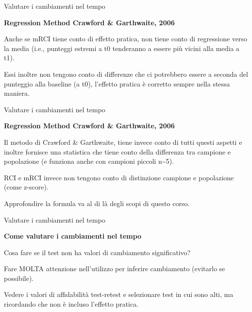 \documentclass[
  ignorenonframetext,
  aspectratio=169,
]{beamer}
\begin{document}
\begin{frame}{Valutare i cambiamenti nel tempo}
\label{valutare-i-cambiamenti-nel-tempo-13}
\begin{center}
\textbf{Regression Method Crawford \& Garthwaite, 2006}
\end{center}
\vspace{2em}

Anche se mRCI tiene conto di effetto pratica, non tiene conto di
regressione verso la media (i.e., punteggi estremi a t0 tenderanno a
essere più vicini alla media a t1).

Essi inoltre non tengono conto di differenze che ci potrebbero essere a
seconda del punteggio alla baseline (a t0), l'effetto pratica è corretto
sempre nella stessa maniera.
\end{frame}

\begin{frame}{Valutare i cambiamenti nel tempo}
\label{valutare-i-cambiamenti-nel-tempo-14}
\begin{center}
\textbf{Regression Method Crawford \& Garthwaite, 2006}
\end{center}
\vspace{2em}

Il metodo di Crawford \& Garthwaite, tiene invece conto di tutti questi
aspetti e inoltre fornisce una statistica che tiene conto della
differenza tra campione e popolazione (e funziona anche con campioni
piccoli n\textasciitilde5).

RCI e mRCI invece non tengono conto di distinzione campione e
popolazione (come z-score).

Approfondire la formula va al di là degli scopi di questo corso.
\end{frame}

\begin{frame}{Valutare i cambiamenti nel tempo}
\label{valutare-i-cambiamenti-nel-tempo-15}
\begin{center}
\textbf{Come valutare i cambiamenti nel tempo}
\end{center}
\vspace{2em}

Cosa fare se il test non ha valori di cambiamento significativo?

Fare MOLTA attenzione nell'utilizzo per inferire cambiamento (evitarlo
se possibile).

Vedere i valori di affidabilità test-retest e selezionare test in cui
sono alti, ma ricordando che non è incluso l'effetto pratica.
\end{frame}
\end{document}
